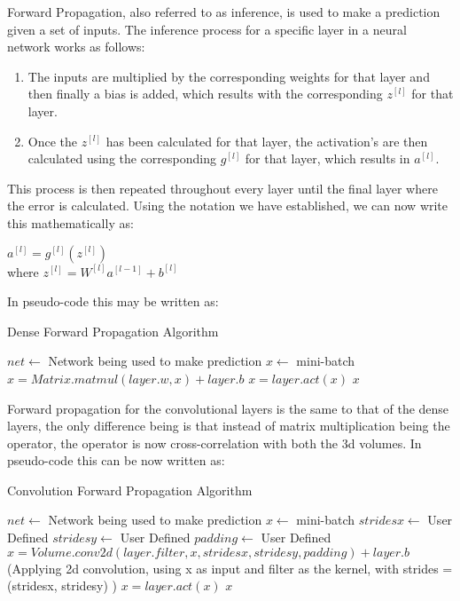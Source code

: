  \label{SForwardProp}
Forward Propagation, also referred to as inference, is used to make a prediction given a set of inputs. The inference process for a specific layer in a neural network works as follows:
\begin{enumerate}
    \item The inputs are multiplied by the corresponding weights for that layer and then finally a bias is added, which results with the corresponding $z^{[l]}$ for that layer.
    \item Once the $z^{[l]}$ has been calculated for that layer, the activation's are then calculated using the corresponding $g^{[l]}$ for that layer, which results in $a^{[l]}$.
\end{enumerate}
This process is then repeated throughout every layer until the final layer where the error is calculated.
Using the notation we have established, we can now write this mathematically as: 
\\
\begin{center}
$a^{[l]} = g^{[l]}(z^{[l]})$ \\ 
where $z^{[l]} = W^{[l]}a^{[l-1]} + b^{[l]}$ 
\end{center}

In pseudo-code this may be written as:

\begin{algorithm}[H]
\caption{Dense Forward Propagation Algorithm}\label{DenseForewardProp}
\begin{algorithmic}[1]
\State $net \gets$ Network being used to make prediction
\State $x \gets$ mini-batch
\\
\State $x = Matrix.matmul(layer.w, x) + layer.b$
\State $x = layer.act(x)$
\EndFor
\Return $x$
\end{algorithmic}
\end{algorithm}

Forward propagation for the convolutional layers is the same to that of the dense layers, the only difference being is that instead of matrix multiplication being the operator, the operator is now cross-correlation with both the 3d volumes. In pseudo-code this can be now written as:

\begin{algorithm}[H]
\caption{Convolution Forward Propagation Algorithm}\label{ConvForewardProp}
\begin{algorithmic}[1]
\State $net \gets$ Network being used to make prediction
\State $x \gets$ mini-batch
\State $stridesx \gets$ User Defined
\State $stridesy \gets$ User Defined
\State $padding \gets$ User Defined
\\
\State $x = Volume.conv2d(layer.filter, x, stridesx, stridesy, padding) + layer.b$ (Applying 2d convolution, using x as input and filter as the kernel, with strides = (stridesx, stridesy) )
\State $x = layer.act(x)$
\EndFor 
\Return $x$
\end{algorithmic}
\end{algorithm}